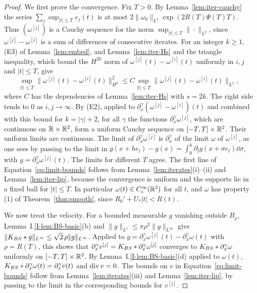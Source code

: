 \begin{proof}
We first prove the convergence. Fix $T>0$. By Lemma~\ref{lem:iter-cauchy} the
series $\sum_j\sup_{|t|\le T}e_j(t)$ is at most
$2\|\omega_0\|_{L^2}\exp(2R(T)\Psi(T)T)$. Thus $(\omega^{[j]})$ is a Cauchy sequence
for the norm $\sup_{|t|\le T}\|\cdot\|_{L^2}$, since $\omega^{[j]}-\omega^{[i]}$ is a
sum of differences of consecutive iterates. For an integer
$k\ge1$, (E3) of Lemma~\ref{lem:embed}, and Lemma~\ref{lem:iter-Hs} and the triangle
inequality, which bound the $H^{2k}$ norm of $\omega^{[j]}(t)-\omega^{[i]}(t)$
uniformly in $i,j$ and $|t|\le T$, give
\[
\sup_{|t|\le T}\|\omega^{[j]}(t)-\omega^{[i]}(t)\|_{H^k}^2\le C\sup_{|t|\le T}\|\omega^{[j]}(t)-\omega^{[i]}(t)\|_{L^2},
\]
where $C$ has the dependencies of Lemma~\ref{lem:iter-Hs} with $s=2k$.
The right side tends to $0$ as $i,j\to\infty$. By (E2), applied to
$\partial_x^\gamma(\omega^{[j]}-\omega^{[i]})(t)$ and combined with this bound for
$k=|\gamma|+2$, for all $\gamma$ the functions
$\partial_x^\gamma\omega^{[j]}$, which are continuous on $\mathbb{R}\times\mathbb{R}^2$, form a
uniform Cauchy sequence on $[-T,T]\times\mathbb{R}^2$. Their uniform limits are
continuous. The limit of $\partial_x^\gamma\omega^{[j]}$ is $\partial_x^\gamma$ of
the limit $\omega$ of $\omega^{[j]}$, as one sees by passing to the limit in
$g(x+he_l)-g(x)=\int_0^h\partial_lg(x+\sigma e_l)\dd\sigma$, with
$g=\partial_x^\gamma\omega^{[j]}(t)$. The limits for
different $T$ agree. The first line of Equation~\eqref{eq:limit-bounds} follows
from Lemma~\ref{lem:iterates}(i)--(ii) and Lemma~\ref{lem:iter-lip}, because the
convergence is uniform and the supports lie in a fixed ball for $|t|\le T$. In
particular $\omega(t)\in C_c^\infty(\mathbb{R}^2)$ for all $t$, and $\omega$ has
property (1) of Theorem~\ref{thm:smooth}, since $R_0'+U_*|t|<R(t)$.

We now treat the velocity. For a bounded measurable $g$ vanishing outside
$B_\rho$, Lemma~I.\ref{I-lem:BS-basic}(b) and $\|g\|_{L^1}\le\pi\rho^2\|g\|_{L^\infty}$
give $\|K_{BS}\ast g\|_{L^\infty}\le\sqrt2\,\rho\|g\|_{L^\infty}$. Applied to
$g=\partial_x^\gamma\omega^{[j]}(t)-\partial_x^\gamma\omega(t)$ with $\rho=R(T)$,
this shows that $\partial_x^\gamma v^{[j]}=K_{BS}\ast\partial_x^\gamma\omega^{[j]}$
converges to $K_{BS}\ast\partial_x^\gamma\omega$ uniformly on $[-T,T]\times\mathbb{R}^2$.
By Lemma~I.\ref{I-lem:BS-basic}(d) applied to $\omega(t)$, $K_{BS}\ast\partial_x^\gamma\omega(t)=\partial_x^\gamma v(t)$
and $\operatorname{div} v=0$. The bounds on $v$ in Equation~\eqref{eq:limit-bounds} follow
from Lemma~\ref{lem:iterates}(iii) and Lemma~\ref{lem:iter-lip}, by passing to the
limit in the corresponding bounds for $v^{[j]}$.


\end{proof}
